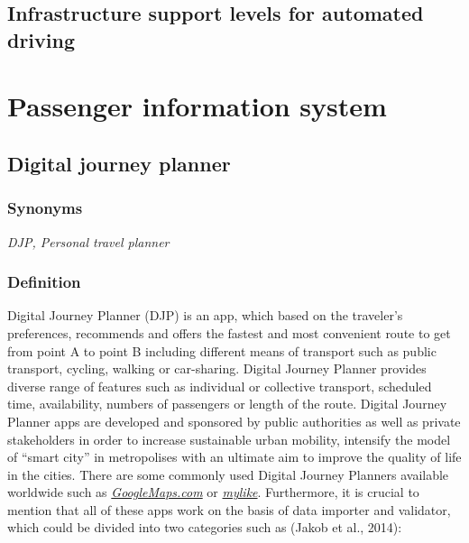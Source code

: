\documentclass[
]{book}
\begin{document}
\hypertarget{infrast_support_level}{%
\section{Infrastructure support levels for automated driving}\label{infrast_support_level}}

\hypertarget{passenger}{%
\chapter{Passenger information system}\label{passenger}}

\hypertarget{djp}{%
\section{Digital journey planner}\label{djp}}

\hypertarget{synonyms-13}{%
\subsection*{Synonyms}\label{synonyms-13}}

\emph{DJP, Personal travel planner}

\hypertarget{definition-14}{%
\subsection*{Definition}\label{definition-14}}

Digital Journey Planner (DJP) is an app, which based on the traveler's preferences, recommends and offers the fastest and most convenient route to get from point A to point B including different means of transport such as public transport, cycling, walking or car-sharing. Digital Journey Planner provides diverse range of features such as individual or collective transport, scheduled time, availability, numbers of passengers or length of the route. Digital Journey Planner apps are developed and sponsored by public authorities as well as private stakeholders in order to increase sustainable urban mobility, intensify the model of ``smart city'' in metropolises with an ultimate aim to improve the quality of life in the cities.
There are some commonly used Digital Journey Planners available worldwide such as \href{https://www.google.com/maps}{\emph{GoogleMaps.com}} or \href{https://mylike.io/personal-travel-planner/}{\emph{mylike}}. Furthermore, it is crucial to mention that all of these apps work on the basis of data importer and validator, which could be divided into two categories such as (Jakob et al., 2014):
\end{document}
